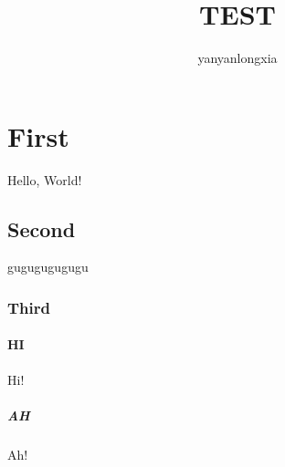 \documentclass{article}
\author{yanyanlongxia}
\title{TEST}
\begin{document}
    \maketitle
    \section{First}
    Hello, World!
    \subsection{Second}
    gugugugugugu
    \subsubsection{Third}
    \paragraph{HI}
    Hi!
    \subparagraph{AH}
    Ah!
\end{document}
